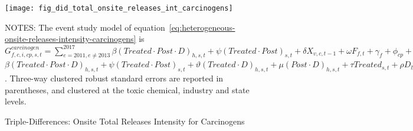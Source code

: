 \begin{figure}[H]
    \centering
    \texttt{[image: fig\_did\_total\_onsite\_releases\_int\_carcinogens]}
    \caption{Triple-Differences: Onsite Total Releases Intensity for Carcinogens}
    \label{fig:heterogeneous-onsite-releases-intensity-carcinogens}
    \begin{minipage}{12cm}
        \vspace{0.05in}
        NOTES: The event study model of equation~\ref{eq:heterogeneous-onsite-releases-intensity-carcinogens} is $G_{f,c,i,cp,s,t}^{carcinogen} = \sum_{{e = 2011},{e \neq 2013}}^{2017} \beta (Treated \cdot Post \cdot D)_{h,s,t} + \psi (Treated \cdot Post)_{s,t} + \delta X_{v,c,t-1} + \omega F_{f,t} + \gamma_{f} + \phi_{cp} + \eta_{c,t} + \left[\lambda_{t} + \theta_{f,h} + \sigma_{s} + \zeta_{c} \right] + \varepsilon_{f,c,i,cp,s,t}$$\beta (Treated \cdot Post \cdot D)_{h,s,t} + \psi (Treated \cdot Post)_{s,t} + \vartheta (Treated \cdot D)_{h,s,t} + \mu (Post \cdot D)_{h,s,t} + \tau Treated_{s,t} + \rho D_{h,s,t} + \alpha Post_{t} + \delta X_{v,c,t-1} + \omega F_{f,t} + \gamma_{f} + \phi_{cp} + \eta_{c,t} + \left[\lambda_{t} + \theta_{h} + \sigma_{s} + \zeta_{c} \right] + \varepsilon_{f,c,i,cp,s,t}$. Three-way clustered robust standard errors are reported in parentheses, and clustered at the toxic chemical, industry and state levels.
    \end{minipage}
\end{figure}